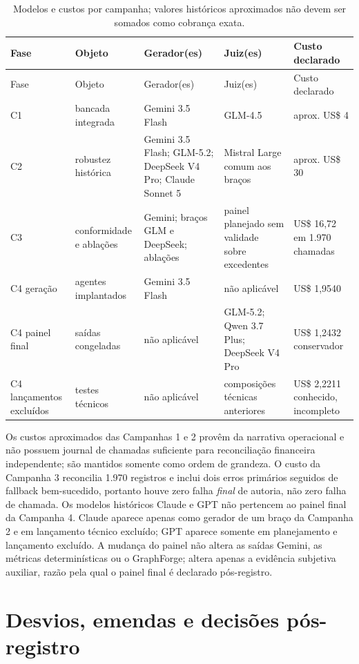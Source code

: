 \documentclass[11pt,a4paper]{article}
\begin{document}
\begingroup
\footnotesize
\setlength{\tabcolsep}{3pt}
\begin{longtable}{@{}P{1.25cm}P{3.0cm}P{4.1cm}P{3.7cm}P{2.2cm}@{}}
\caption{Modelos e custos por campanha; valores históricos aproximados não devem ser somados como cobrança exata.}\label{tab:model-cost-registry}\\
\toprule
Fase & Objeto & Gerador(es) & Juiz(es) & Custo declarado \\
\midrule
\endfirsthead
\toprule
Fase & Objeto & Gerador(es) & Juiz(es) & Custo declarado \\
\midrule
\endhead
C1 & bancada integrada & Gemini 3.5 Flash & GLM-4.5 & aprox. US\$ 4 \\
C2 & robustez histórica & Gemini 3.5 Flash; GLM-5.2; DeepSeek V4 Pro; Claude Sonnet 5 & Mistral Large comum aos braços & aprox. US\$ 30 \\
C3 & conformidade e ablações & Gemini; braços GLM e DeepSeek; ablações & painel planejado sem validade sobre excedentes & US\$ 16,72 em 1.970 chamadas \\
C4 geração & agentes implantados & Gemini 3.5 Flash & não aplicável & US\$ 1,9540 \\
C4 painel final & saídas congeladas & não aplicável & GLM-5.2; Qwen 3.7 Plus; DeepSeek V4 Pro & US\$ 1,2432 conservador \\
C4 lançamentos excluídos & testes técnicos & não aplicável & composições técnicas anteriores & US\$ 2,2211 conhecido, incompleto \\
\bottomrule
\end{longtable}
\endgroup

Os custos aproximados das Campanhas 1 e 2 provêm da narrativa operacional e não possuem journal de chamadas suficiente para reconciliação financeira independente; são mantidos somente como ordem de grandeza. O custo da Campanha 3 reconcilia 1.970 registros e inclui dois erros primários seguidos de fallback bem-sucedido, portanto houve zero falha \emph{final} de autoria, não zero falha de chamada. Os modelos históricos Claude e GPT não pertencem ao painel final da Campanha 4. Claude aparece apenas como gerador de um braço da Campanha 2 e em lançamento técnico excluído; GPT aparece somente em planejamento e lançamento excluído. A mudança do painel não altera as saídas Gemini, as métricas determinísticas ou o GraphForge; altera apenas a evidência subjetiva auxiliar, razão pela qual o painel final é declarado pós-registro.

\section{Desvios, emendas e decisões pós-registro}
\end{document}
